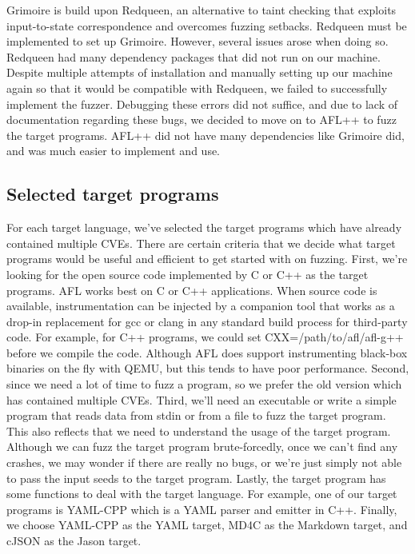 \documentclass[12pt]{diazessay}
\begin{document}
Grimoire is build upon Redqueen, an alternative to taint checking that exploits input-to-state correspondence and overcomes fuzzing setbacks. 
Redqueen must be implemented to set up Grimoire. However, several issues arose when doing so. Redqueen had many dependency packages that did not run on our machine. 
Despite multiple attempts of installation and manually setting up our machine again so that it would be compatible with Redqueen, we failed to successfully implement the fuzzer. Debugging these errors did not suffice, and due to lack of documentation regarding these bugs, we decided to move on to AFL++ to fuzz the target programs. 
AFL++ did not have many dependencies like Grimoire did, and was much easier to implement and use. 

\subsection*{Selected target programs}


For each target language, we’ve selected the target programs which have already contained multiple CVEs. There are certain criteria that we decide what target programs would be useful and efficient to get started with on fuzzing.  
First, we’re looking for the open source code implemented by C or C++ as the target programs.  AFL works best on C or C++ applications. When source code is available, instrumentation can be injected by a companion tool that works as a drop-in replacement for gcc or clang in any standard build process for third-party code. For example, for C++ programs, we could set CXX=/path/to/afl/afl-g++ before we compile the code. Although AFL does support instrumenting black-box binaries on the fly with QEMU, but this tends to have poor performance. 
Second, since we need a lot of time to fuzz a program, so we prefer the old version which has contained multiple CVEs. 
Third, we’ll need an executable or write a simple program that reads data from stdin or from a file to fuzz the target program.  This also reflects that we need to understand the usage of the target program. Although we can fuzz the target program brute-forcedly, once we can’t find any crashes, we may wonder if there are really no bugs, or we’re just simply not able to pass the input seeds to the target program. 
Lastly, the target program has some functions to deal with the target language. For example, one of our target programs is YAML-CPP\cite{YAML-CPP} which is a YAML parser and emitter in C++. Finally, we choose YAML-CPP as the YAML target, MD4C\cite{MD4C} as the Markdown target, and cJSON\cite{cJSON} as the Jason target.  
\end{document}
